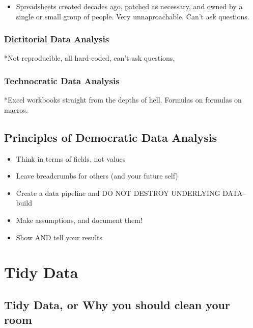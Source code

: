 \documentclass[]{book}
\providecommand{\tightlist}{%
  \setlength{\itemsep}{0pt}\setlength{\parskip}{0pt}}
\begin{document}
\begin{itemize}
\tightlist
\item
  Spreadsheets created decades ago, patched as necessary, and owned by a
  single or small group of people. Very unnaproachable. Can't ask
  questions.
\end{itemize}

\subsection*{Dictitorial Data Analysis}\label{dictitorial-data-analysis}

*Not reproducible, all hard-coded, can't ask questions,

\subsection*{Technocratic Data
Analysis}\label{technocratic-data-analysis}

*Excel workbooks straight from the depths of hell. Formulas on formulas
on macros.

\section{Principles of Democratic Data
Analysis}\label{principles-of-democratic-data-analysis}

\begin{itemize}
\tightlist
\item
  Think in terms of fields, not values
\item
  Leave breadcrumbs for others (and your future self)
\item
  Create a data pipeline and DO NOT DESTROY UNDERLYING DATA-- build
\item
  Make assumptions, and document them!
\item
  Show AND tell your results
\end{itemize}

\chapter{Tidy Data}\label{tidy-data}

\section{Tidy Data, or Why you should clean your
room}\label{tidy-data-or-why-you-should-clean-your-room}
\end{document}
